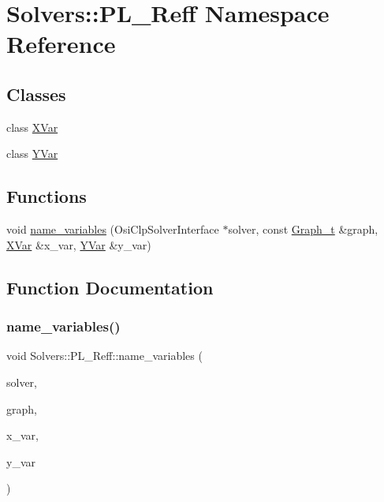\hypertarget{namespace_solvers_1_1_p_l___reff}{}\section{Solvers\+:\+:P\+L\+\_\+\+Reff Namespace Reference}
\label{namespace_solvers_1_1_p_l___reff}
\subsection*{Classes}
\begin{DoxyCompactItemize}
\item 
class \hyperlink{class_solvers_1_1_p_l___reff_1_1_x_var}{X\+Var}
\item 
class \hyperlink{class_solvers_1_1_p_l___reff_1_1_y_var}{Y\+Var}
\end{DoxyCompactItemize}
\subsection*{Functions}
\begin{DoxyCompactItemize}
\item 
void \hyperlink{namespace_solvers_1_1_p_l___reff_a5ba7b3bc35f6d6647c056e1c1d9ecf2b}{name\+\_\+variables} (Osi\+Clp\+Solver\+Interface $\ast$solver, const \hyperlink{pl__reff_8cpp_a65aea14f39d53b24df9910d54216d620}{Graph\+\_\+t} \&graph, \hyperlink{class_solvers_1_1_p_l___reff_1_1_x_var}{X\+Var} \&x\+\_\+var, \hyperlink{class_solvers_1_1_p_l___reff_1_1_y_var}{Y\+Var} \&y\+\_\+var)
\end{DoxyCompactItemize}


\subsection{Function Documentation}
\mbox{\label{namespace_solvers_1_1_p_l___reff_a5ba7b3bc35f6d6647c056e1c1d9ecf2b}} 
\subsubsection{\texorpdfstring{name\+\_\+variables()}{name\_variables()}}
{\footnotesize\ttfamily void Solvers\+::\+P\+L\+\_\+\+Reff\+::name\+\_\+variables (\begin{DoxyParamCaption}\item[{Osi\+Clp\+Solver\+Interface $\ast$}]{solver,  }\item[{const \hyperlink{pl__reff_8cpp_a65aea14f39d53b24df9910d54216d620}{Graph\+\_\+t} \&}]{graph,  }\item[{\hyperlink{class_solvers_1_1_p_l___reff_1_1_x_var}{X\+Var} \&}]{x\+\_\+var,  }\item[{\hyperlink{class_solvers_1_1_p_l___reff_1_1_y_var}{Y\+Var} \&}]{y\+\_\+var }\end{DoxyParamCaption})}

